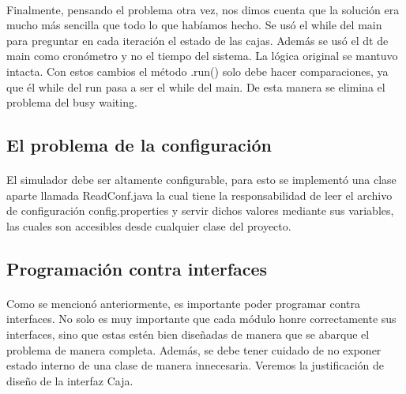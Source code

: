 \documentclass{article}
\begin{document}
\paragraph{}
Finalmente, pensando el problema otra vez, nos dimos cuenta que la solución era mucho más sencilla que todo lo que habíamos hecho. Se usó el while del main para preguntar en cada iteración el estado de las cajas. Además se usó el dt de main como cronómetro y no el tiempo del sistema. La lógica original se mantuvo intacta. Con estos cambios el método .run() solo debe hacer comparaciones, ya que él while del run pasa a ser el while del main. De esta manera se elimina el problema del busy waiting.

\subsection{El problema de la configuración}

\paragraph{}
El simulador debe ser altamente configurable, para esto se implementó una clase aparte llamada ReadConf.java la cual tiene la responsabilidad de leer el archivo de configuración config.properties y servir dichos valores mediante sus variables, las cuales son accesibles desde cualquier clase del proyecto.

\subsection{Programación contra interfaces}

\paragraph{}
Como se mencionó anteriormente, es importante poder programar contra interfaces. No solo es muy importante que cada módulo honre correctamente sus interfaces, sino que estas estén bien diseñadas de manera que se abarque el problema de manera completa. Además, se debe tener cuidado de no exponer estado interno de una clase de manera innecesaria. Veremos la justificación de diseño de la interfaz Caja.
\end{document}
